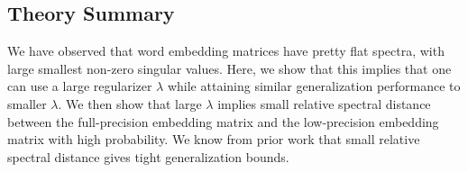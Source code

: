 \subsection{Theory Summary}
We have observed that word embedding matrices have pretty flat spectra, with large smallest non-zero singular values.  Here, we show that this implies that one can use a large regularizer $\lambda$ while attaining similar generalization performance to smaller $\lambda$.  We then show that large $\lambda$ implies small relative spectral distance between the full-precision embedding matrix and the low-precision embedding matrix with high probability.  We know from prior work that small relative spectral distance gives tight generalization bounds.

	


